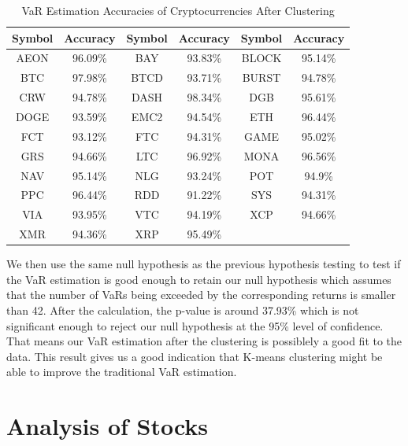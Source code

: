 \documentclass[11pt]{article} %
\theoremstyle{plain}
\theoremstyle{definition}
\begin{document}
{
  \begin{table}[ht]
    \centering
    \small
    \begin{tabular}{|c|c|c|c|c|c|}
        \hline
        Symbol & Accuracy & Symbol & Accuracy & Symbol & Accuracy \\
        \hline
        AEON & \color{red}96.09\% & BAY & 93.83\% & BLOCK & \color{red}95.14\% \\
        BTC & \color{red}97.98\% & BTCD & 93.71\% & BURST & \color{red}94.78\% \\
        CRW & 94.78\% & DASH & \color{red}98.34\% & DGB & \color{red}95.61\% \\
        DOGE & 93.59\% & EMC2 & 94.54\% & ETH & \color{red}96.44\% \\
        FCT & 93.12\% & FTC & 94.31\% & GAME & \color{red}95.02\% \\
        GRS & \color{red}94.66\% & LTC & \color{red}96.92\% & MONA & \color{red}96.56\% \\
        NAV & \color{red}95.14\% & NLG & 93.24\% & POT & \color{red}94.9\% \\
        PPC & \color{red}96.44\% & RDD & 91.22\% & SYS & \color{red}94.31\% \\
        VIA & 93.95\% & VTC & \color{red}94.19\% & XCP & \color{red}94.66\% \\
        XMR & 94.36\% & XRP & \color{red}95.49\% & & \\
        \hline
    \end{tabular}
    \caption{VaR Estimation Accuracies of Cryptocurrencies After Clustering}
    \label{table:acccryptoafter}
  \end{table}
}

We then use the same null hypothesis as the previous hypothesis testing to test if the VaR estimation is good enough to retain our null hypothesis which assumes that the number of VaRs being exceeded by the corresponding returns is smaller than 42. After the calculation, the p-value is around 37.93\% which is not significant enough to reject our null hypothesis at the 95\% level of confidence. That means our VaR estimation after the clustering is possiblely a good fit to the data. This result gives us a good indication that K-means clustering might be able to improve the traditional VaR estimation.

\section{Analysis of Stocks}
\end{document}
